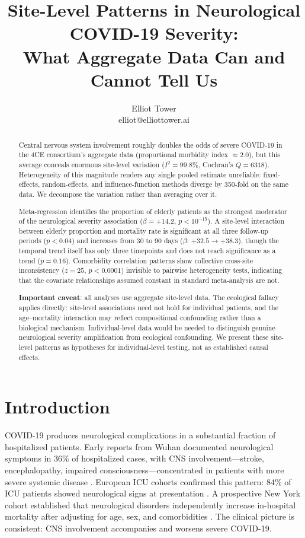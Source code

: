 \documentclass{article}
\title{Site-Level Patterns in Neurological COVID-19 Severity:\\What Aggregate Data Can and Cannot Tell Us}
\author{\name Elliot Tower \\
      \email elliot@elliottower.ai}
\begin{document}
\maketitle

\begin{abstract}
Central nervous system involvement roughly doubles the odds of severe COVID-19 in the 4CE consortium's aggregate data (proportional morbidity index $\approx 2.0$), but this average conceals enormous site-level variation ($I^2 = 99.8\%$, Cochran's $Q = 6318$).
Heterogeneity of this magnitude renders any single pooled estimate unreliable: fixed-effects, random-effects, and influence-function methods diverge by 350-fold on the same data.
We decompose the variation rather than averaging over it.

Meta-regression identifies the proportion of elderly patients as the strongest moderator of the neurological severity association ($\beta = +14.2$, $p < 10^{-15}$).
A site-level interaction between elderly proportion and mortality rate is significant at all three follow-up periods ($p < 0.04$) and increases from 30 to 90 days ($\beta$: $+32.5 \to +38.3$), though the temporal trend itself has only three timepoints and does not reach significance as a trend ($p = 0.16$).
Comorbidity correlation patterns show collective cross-site inconsistency ($z = 25$, $p < 0.0001$) invisible to pairwise heterogeneity tests, indicating that the covariate relationships assumed constant in standard meta-analysis are not.

\textbf{Important caveat}: all analyses use aggregate site-level data.
The ecological fallacy applies directly: site-level associations need not hold for individual patients, and the age--mortality interaction may reflect compositional confounding rather than a biological mechanism.
Individual-level data would be needed to distinguish genuine neurological severity amplification from ecological confounding.
We present these site-level patterns as hypotheses for individual-level testing, not as established causal effects.
\end{abstract}


\section{Introduction}

COVID-19 produces neurological complications in a substantial fraction of hospitalized patients.
Early reports from Wuhan documented neurological symptoms in 36\% of hospitalized cases, with CNS involvement---stroke, encephalopathy, impaired consciousness---concentrated in patients with more severe systemic disease \cite{mao2020neuro}.
European ICU cohorts confirmed this pattern: 84\% of ICU patients showed neurological signs at presentation \cite{helms2020neuro}.
A prospective New York cohort established that neurological disorders independently increase in-hospital mortality after adjusting for age, sex, and comorbidities \cite{frontera2021neuro}.
The clinical picture is consistent: CNS involvement accompanies and worsens severe COVID-19.
\end{document}
